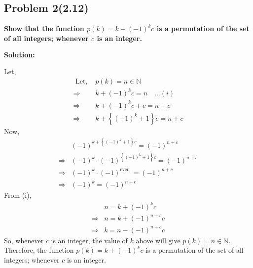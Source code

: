 \subsection{Problem 2(2.12)}
\textbf{Show that the function $p(k)=k+(-1)^k c$ is a permutation of the set of all integers; whenever $c$ is an integer.}
\par

\begin{flushleft}
\textbf{Solution: }
\par
Let,
$$
\begin{aligned}
\text { Let, } & p(k)=n \in \mathbb{N} \\
\Rightarrow & k+(-1)^k c=n \quad . . .(i) \\
\Rightarrow & k+(-1)^k c+c=n+c \\
\Rightarrow & k+\left\{(-1)^k+1\right\} c=n+c
\end{aligned}
$$
Now,
$$
\begin{aligned}
& (-1)^{k+\left\{(-1)^k+1\right\} c}=(-1)^{n+c} \\
\Rightarrow & (-1)^k \cdot (-1)^{\left\{(-1)^k+1\right\} c}=(-1)^{n+c} \\
\Rightarrow & (-1)^k \cdot (-1)^{\text {even }}=(-1)^{n+c} \\
\Rightarrow & (-1)^k=(-1)^{n+c}
\end{aligned}
$$
From (i),
$$
\begin{aligned}
& n=k+(-1)^k c \\
\Rightarrow & n=k+(-1)^{n+c} c \\
\Rightarrow & k=n-(-1)^{n+c} c
\end{aligned}
$$
So, whenever $c$ is an integer, the value of $k$ above will give $p(k)=n \in \mathbb{N}$.
Therefore, the function $p(k)=k+(-1)^k c$ is a permutation of the set of all integers; whenever $c$ is an integer.
\end{flushleft}


